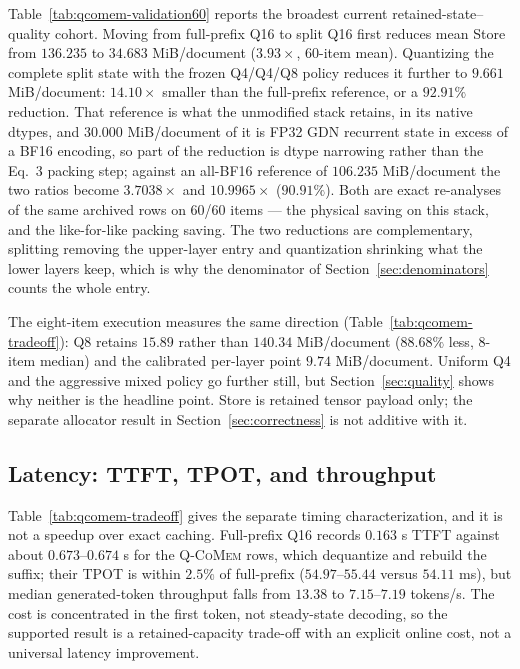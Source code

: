 \documentclass{article}
\newcommand{\qcomem}{\textsc{Q-CoMem}}
\begin{document}
Table~\ref{tab:qcomem-validation60} reports the broadest current
retained-state--quality cohort.  Moving from full-prefix Q16 to split Q16 first
reduces mean Store from $136.235$ to $34.683$ MiB/document ($3.93\times$,
60-item mean).  Quantizing the complete split state with the frozen Q4/Q4/Q8
policy reduces it further to $9.661$ MiB/document: $14.10\times$ smaller than
the full-prefix reference, or a $92.91\%$ reduction.  That reference is what the
unmodified stack retains, in its native dtypes, and $30.000$ MiB/document of it
is FP32 GDN recurrent state in excess of a BF16 encoding, so part of the
reduction is dtype narrowing rather than the Eq.~3 packing step; against an
all-BF16 reference of $106.235$ MiB/document the two ratios become
$3.7038\times$ and $10.9965\times$ ($90.91\%$).  Both are exact re-analyses of
the same archived rows on 60/60 items --- the physical saving on this stack,
and the like-for-like packing saving.  The two reductions are complementary,
splitting removing the upper-layer entry and quantization shrinking what the
lower layers keep, which is why the denominator of
Section~\ref{sec:denominators} counts the whole entry.

The eight-item execution measures the same direction
(Table~\ref{tab:qcomem-tradeoff}): Q8 retains $15.89$ rather than $140.34$
MiB/document ($88.68\%$ less, 8-item median) and the calibrated per-layer point
$9.74$ MiB/document.  Uniform Q4 and the aggressive mixed policy go further
still, but Section~\ref{sec:quality} shows why neither is the headline point.
Store is retained tensor payload only; the separate allocator result in
Section~\ref{sec:correctness} is not additive with it.



\subsection{Latency: TTFT, TPOT, and throughput}
\label{sec:latency}

Table~\ref{tab:qcomem-tradeoff} gives the separate timing characterization, and
it is not a speedup over exact caching. Full-prefix Q16 records $0.163$ s TTFT
against about $0.673$--$0.674$ s for the \qcomem{} rows, which dequantize and
rebuild the suffix; their TPOT is within $2.5\%$ of full-prefix
($54.97$--$55.44$ versus $54.11$ ms), but median generated-token throughput
falls from $13.38$ to $7.15$--$7.19$ tokens/s. The cost is concentrated in the
first token, not steady-state decoding, so the supported result is a
retained-capacity trade-off with an explicit online cost, not a universal
latency improvement.
\end{document}
